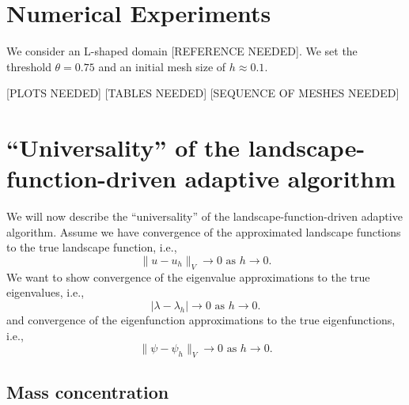 \section{Numerical Experiments}

We consider an L-shaped domain [REFERENCE NEEDED].
We set the threshold \(\theta = 0.75\) and an initial mesh size of \(h \approx 0.1\).

[PLOTS NEEDED]
[TABLES NEEDED]
[SEQUENCE OF MESHES NEEDED]

\section{``Universality'' of the landscape-function-driven adaptive algorithm}

We will now describe the ``universality'' of the landscape-function-driven adaptive algorithm.
Assume we have convergence of the approximated landscape functions to the true landscape function, i.e.,
\begin{equation}
    \label{eq:convergence}
    \lVert u - u_h \rVert_{V} \to 0 \text{ as } h \to 0.
\end{equation}
We want to show convergence of the eigenvalue approximations to the true eigenvalues, i.e.,
\begin{equation}
    \label{eq:eigenvalue_convergence}
    \lvert \lambda - \lambda_h \rvert \to 0 \text{ as } h \to 0.
\end{equation}
and convergence of the eigenfunction approximations to the true eigenfunctions, i.e.,
\begin{equation}
    \label{eq:eigenfunction_convergence}
    \lVert \psi - \psi_h \rVert_{V} \to 0 \text{ as } h \to 0.
\end{equation}


\subsection{Mass concentration}

